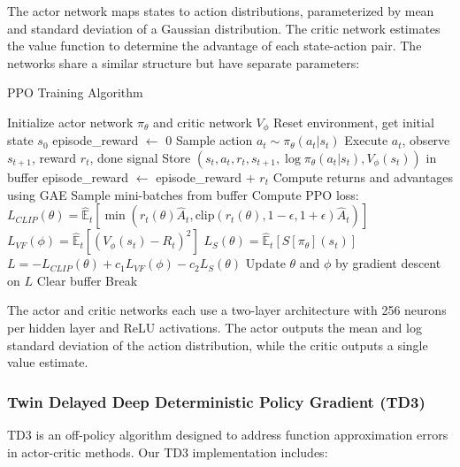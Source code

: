 \documentclass[12pt]{article}
\begin{document}
The actor network maps states to action distributions, parameterized by mean and standard deviation of a Gaussian distribution. The critic network estimates the value function to determine the advantage of each state-action pair. The networks share a similar structure but have separate parameters:

\begin{algorithm}
\caption{PPO Training Algorithm}
\begin{algorithmic}[1]
\State Initialize actor network $\pi_\theta$ and critic network $V_\phi$
    \State Reset environment, get initial state $s_0$
    \State episode\_reward $\gets$ 0
        \State Sample action $a_t \sim \pi_\theta(a_t|s_t)$
        \State Execute $a_t$, observe $s_{t+1}$, reward $r_t$, done signal
        \State Store $(s_t, a_t, r_t, s_{t+1}, \log\pi_\theta(a_t|s_t), V_\phi(s_t))$ in buffer
        \State episode\_reward $\gets$ episode\_reward + $r_t$
            \State Compute returns and advantages using GAE
                \State Sample mini-batches from buffer
                \State Compute PPO loss:
                \State $L_{CLIP}(\theta) = \hat{\mathbb{E}}_t[\min(r_t(\theta)\hat{A}_t, \text{clip}(r_t(\theta), 1-\epsilon, 1+\epsilon)\hat{A}_t)]$
                \State $L_{VF}(\phi) = \hat{\mathbb{E}}_t[(V_\phi(s_t) - R_t)^2]$
                \State $L_{S}(\theta) = \hat{\mathbb{E}}_t[S[\pi_\theta](s_t)]$
                \State $L = -L_{CLIP}(\theta) + c_1 L_{VF}(\phi) - c_2 L_{S}(\theta)$
                \State Update $\theta$ and $\phi$ by gradient descent on $L$
            \EndFor
            \State Clear buffer
        \EndIf
            \State Break
        \EndIf
    \EndFor
\EndFor
\end{algorithmic}
\end{algorithm}

The actor and critic networks each use a two-layer architecture with 256 neurons per hidden layer and ReLU activations. The actor outputs the mean and log standard deviation of the action distribution, while the critic outputs a single value estimate.

\subsubsection{Twin Delayed Deep Deterministic Policy Gradient (TD3)}

TD3 is an off-policy algorithm designed to address function approximation errors in actor-critic methods. Our TD3 implementation includes:
\end{document}
